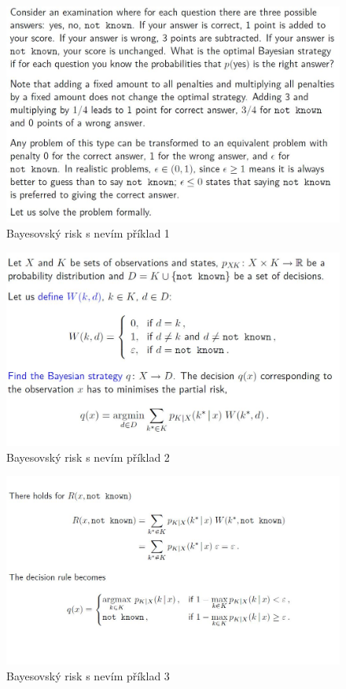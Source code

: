 \documentclass{article}
\begin{document}
\begin{figure}[h]
\begin{center}
\includegraphics[width=12cm]{bayes_reject_example.jpg}
\caption{Bayesovský risk s nevím příklad 1}
\label{fig:bayes_reject_example1}
\end{center}
\end{figure}

\begin{figure}[h]
\begin{center}
\includegraphics[width=12cm]{bayes_reject_example1.jpg}
\caption{Bayesovský risk s nevím příklad 2}
\label{fig:bayes_reject_example2}
\end{center}
\end{figure}

\begin{figure}[h]
\begin{center}
\includegraphics[width=12cm]{bayes_reject_example2.jpg}
\caption{Bayesovský risk s nevím příklad 3}
\label{fig:bayes_reject_example3}
\end{center}
\end{figure}
\end{document}
